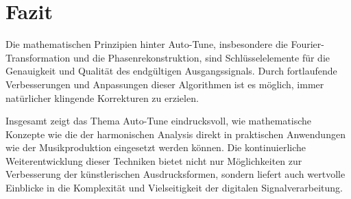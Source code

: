 %
%
%
%
\section{Fazit
\label{autotune:section:fazit}}
Die mathematischen Prinzipien hinter Auto-Tune, insbesondere die Fourier-Transformation und die Phasenrekonstruktion,
sind Schlüsselelemente für die Genauigkeit und Qualität des endgültigen Ausgangssignals.
Durch fortlaufende Verbesserungen und Anpassungen dieser Algorithmen ist es möglich, immer natürlicher klingende Korrekturen zu erzielen.

Insgesamt zeigt das Thema Auto-Tune eindrucksvoll, wie mathematische Konzepte wie die der harmonischen Analysis direkt in praktischen Anwendungen wie der Musikproduktion eingesetzt werden können.
Die kontinuierliche Weiterentwicklung dieser Techniken bietet nicht nur Möglichkeiten zur Verbesserung der künstlerischen Ausdrucksformen,
sondern liefert auch wertvolle Einblicke in die Komplexität und Vielseitigkeit der digitalen Signalverarbeitung.
